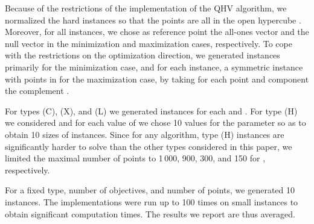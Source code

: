 \documentclass[a4paper,11pt]{article}
\begin{document}
\begin{table}
  \begin{center}
    \setlength{\tabcolsep}{5pt}
  \end{center}

  \caption{Restrictions of the tested implementations of the hypervolume algorithms considered for computational experiments\label{tab:restrictions}}
\end{table}

Because of the restrictions of the implementation of the QHV algorithm, 
we normalized the hard instances so that the points are all in 
the open hypercube .
Moreover, for all instances, we chose as reference point the all-ones vector 
and the null vector in the minimization and maximization cases, respectively.
To cope with the restrictions on the optimization direction, 
we generated instances primarily for the minimization case, 
and for each instance, a symmetric instance with points in  for the maximization case,
by taking for each point  and component  the complement .

For types (C), (X), and (L) we generated instances for each 
and . For type (H) we considered 
 and for each value of  we chose 10 values for the parameter 
so as to obtain 10 sizes of instances.
Since for any algorithm, type (H) instances are significantly harder to solve 
than the other types considered in this paper,
we limited the maximal number of points to 1\,000, 900, 300, and 150 
for , respectively.

For a fixed type, number of objectives, and number of points, we generated 10 instances. 
The implementations were run up to 100 times on small instances to obtain significant
computation times. The results we report are thus averaged.
\end{document}

